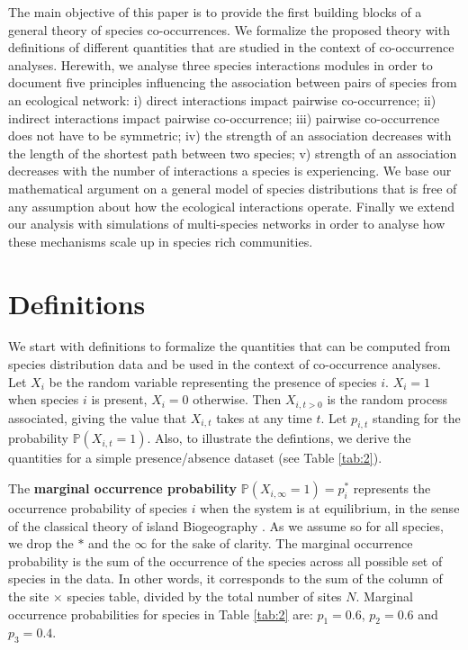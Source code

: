 The main objective of this paper is to provide the first building blocks of a general theory of species co-occurrences. We formalize the proposed theory with definitions of different quantities that are studied in the context of co-occurrence analyses. Herewith, we analyse three species interactions modules in order to document five principles influencing the association between pairs of species from an ecological network:
i) direct interactions impact pairwise co-occurrence;
ii) indirect interactions impact pairwise co-occurrence;
iii) pairwise co-occurrence does not have to be symmetric;
iv) the strength of an association decreases with the length of the shortest path between two species;
v) strength of an association decreases with the number of interactions a species is experiencing.
We base our mathematical argument on a general model of species distributions that is free of
any assumption about how the ecological interactions operate. Finally we
extend our analysis with simulations of multi-species networks in order to
analyse how these mechanisms scale up in species rich communities.



\section{Definitions}
\label{def}


We start with definitions to formalize the quantities that can be computed
from species distribution data and be used in the context of co-occurrence
analyses. Let $X_i$ be the random variable representing the presence of species
$i$. $X_i=1$ when species $i$ is present, $X_i=0$ otherwise. Then $X_{i,t>0}$ is
the random process associated, giving the value that $X_{i,t}$ takes at any time
$t$. Let $p_{i,t}$ standing for the probability $\mathbb{P}(X_{i,t}=1)$. Also, to illustrate the defintions, we derive the quantities for a simple presence/absence dataset (see Table \ref{tab:2}).

The \textbf{marginal occurrence probability} $\mathbb{P}(X_{i,\infty}=1)=p_i^*$
represents the occurrence probability of species $i$ when the system is at
equilibrium, in the sense of the classical theory of island Biogeography \cite{Macarthur1967Theory}. As we assume so for all species, we drop the $*$ and the $\infty$ for the sake of clarity. The marginal occurrence probability is the sum of the occurrence of the species across all possible set of species in the data. In other words, it corresponds to the sum of the column of the site $\times$ species table, divided by the total number of sites
$N$. Marginal occurrence probabilities for species in Table \ref{tab:2} are: $p_1=0.6$, $p_2=0.6$ and $p_3=0.4$.

